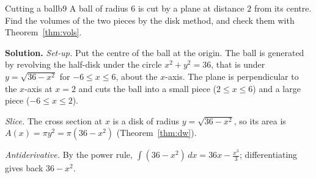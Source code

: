 \documentclass[11pt]{article}
\begin{document}
\begin{exmp}{Cutting a ball}{b9}
A ball of radius $6$ is cut by a plane at distance $2$ from its centre. Find the volumes of the two pieces by the disk method, and check them with Theorem~\ref{thm:vols}.

\textbf{Solution.} \emph{Set-up.} Put the centre of the ball at the origin. The ball is generated by revolving the half-disk under the circle $x^2+y^2=36$, that is under $y=\sqrt{36-x^2}$ for $-6\le x\le6$, about the $x$-axis. The plane is perpendicular to the $x$-axis at $x=2$ and cuts the ball into a small piece ($2\le x\le6$) and a large piece ($-6\le x\le2$).

\emph{Slice.} The cross section at $x$ is a disk of radius $y=\sqrt{36-x^2}$, so its area is $A(x)=\pi y^2=\pi(36-x^2)$ (Theorem~\ref{thm:dw}).

\emph{Antiderivative.} By the power rule, $\int(36-x^2)\,dx=36x-\frac{x^3}3$; differentiating gives back $36-x^2$.


\end{exmp}
\end{document}
